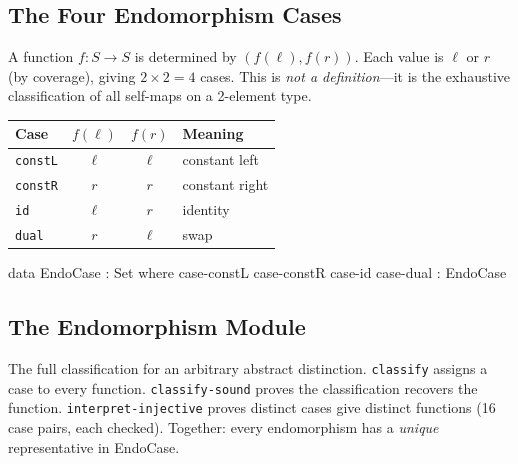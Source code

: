 \documentclass[11pt,a4paper]{article}
\begin{document}
\subsection{The Four Endomorphism Cases}

A function $f : S \to S$ is determined by $(f(\ell), f(r))$.
Each value is $\ell$ or $r$ (by coverage), giving $2 \times 2 = 4$
cases. This is \emph{not a definition}---it is the exhaustive
classification of all self-maps on a 2-element type.

\begin{center}
\begin{tabular}{lccl}
\toprule
\textbf{Case} & $f(\ell)$ & $f(r)$ & \textbf{Meaning} \\
\midrule
\texttt{constL} & $\ell$ & $\ell$ & constant left \\
\texttt{constR} & $r$    & $r$    & constant right \\
\texttt{id}     & $\ell$ & $r$    & identity \\
\texttt{dual}   & $r$    & $\ell$ & swap \\
\bottomrule
\end{tabular}
\end{center}

\begin{code}
data EndoCase : Set where
  case-constL case-constR case-id case-dual : EndoCase
\end{code}

\subsection{The Endomorphism Module}

The full classification for an arbitrary abstract distinction.
\texttt{classify} assigns a case to every function.
\texttt{classify-sound} proves the classification recovers the function.
\texttt{interpret-injective} proves distinct cases give distinct functions
(16 case pairs, each checked).
Together: every endomorphism has a \emph{unique} representative in EndoCase.
\end{document}
